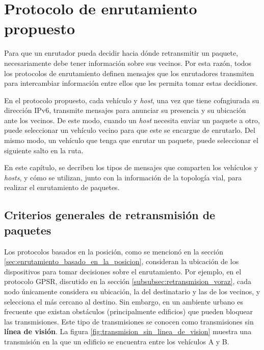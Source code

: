 ﻿\chapter{Protocolo de enrutamiento propuesto}
\label{ch:protocolo_de_enrutamiento_propuesto}

Para que un enrutador pueda decidir hacia dónde retransmitir un paquete,
necesariamente debe tener información sobre sus vecinos. Por esta razón, todos
los protocolos de enrutamiento definen mensajes que los enrutadores transmiten
para intercambiar información entre ellos que les permita tomar estas
decidiones.

En el protocolo propuesto, cada vehículo y \textit{host}, una vez que tiene
cofngiurada su dirección IPv6, transmite mensajes para anunciar su presencia y
su ubicación ante los vecinos. De este modo, cuando un \textit{host} necesita
enviar un paquete a otro, puede seleccionar un vehículo vecino para que este se
encargue de enrutarlo. Del mismo modo, un vehículo que tenga que enrutar un
paquete, puede seleccionar el siguiente salto en la ruta.

En este capítulo, se decriben los tipos de mensajes que comparten los vehículos
y \textit{hosts}, y cómo se utilizan, junto con la información de la topología
vial, para realizar el enrutamiento de paquetes. 

\section{Criterios generales de retransmisión de paquetes}
\label{sec:criterios_generales_retransmision_paquetes}

Los protocolos basados en la posición, como se mencionó en la sección
\ref{sec:enrutamiento_basado_en_la_posicion}, consideran la ubicación de los
dispositivos para tomar decisiones sobre el enrutamiento. Por ejemplo, en el
protocolo GPSR, discutido en la sección \ref{subsubsec:retransmision_voraz},
cada nodo únicamente considera su ubicación, la del destinatario y las de los
vecinos, y selecciona el más cercano al destino. Sin embargo, en un ambiente
urbano es frecuente que existan obstáculos (principalmente edificios) que
pueden bloquear las transmisiones. Este tipo de transmisiones se conocen como
transmisiones sin \textbf{línea de visión}. La figura
\ref{fig:transmision_sin_linea_de_vision} muestra una transmisión en la que un
edificio se encuentra entre los vehículos A y B.

